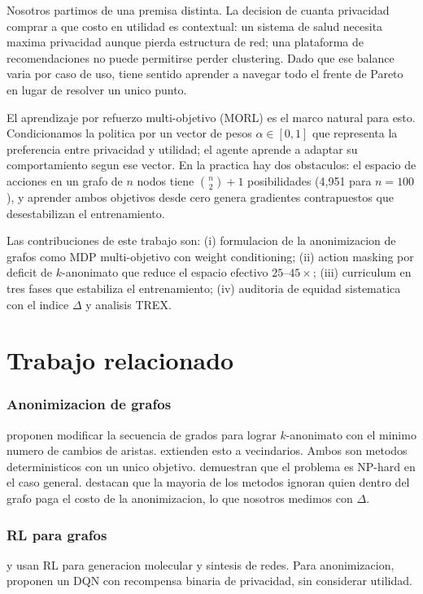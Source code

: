 \documentclass[10pt,twocolumn,letterpaper]{article}
\newcommand{\Ddelta}{\Delta}
\begin{document}
Nosotros partimos de una premisa distinta. La decision de cuanta privacidad comprar a
que costo en utilidad es contextual: un sistema de salud necesita maxima privacidad
aunque pierda estructura de red; una plataforma de recomendaciones no puede permitirse
perder clustering. Dado que ese balance varia por caso de uso, tiene sentido aprender
a navegar todo el frente de Pareto en lugar de resolver un unico punto.

El aprendizaje por refuerzo multi-objetivo (MORL) es el marco natural para esto.
Condicionamos la politica por un vector de pesos $\alpha \in [0,1]$ que representa la
preferencia entre privacidad y utilidad; el agente aprende a adaptar su comportamiento
segun ese vector. En la practica hay dos obstaculos: el espacio de acciones en un
grafo de $n$ nodos tiene $\binom{n}{2}+1$ posibilidades (4{,}951 para $n=100$), y
aprender ambos objetivos desde cero genera gradientes contrapuestos que desestabilizan
el entrenamiento.

Las contribuciones de este trabajo son: (i) formulacion de la anonimizacion de grafos
como MDP multi-objetivo con weight conditioning; (ii) action masking por deficit de
$k$-anonimato que reduce el espacio efectivo $25$--$45\times$; (iii) curriculum en
tres fases que estabiliza el entrenamiento; (iv) auditoria de equidad sistematica con
el indice $\Ddelta$ y analisis TREX.

\section{Trabajo relacionado}

\subsubsection*{Anonimizacion de grafos}
\citet{liu2008towards} proponen modificar la secuencia de grados para lograr
$k$-anonimato con el minimo numero de cambios de aristas. \citet{zhou2008preserving}
extienden esto a vecindarios. Ambos son metodos deterministicos con un unico objetivo.
\citet{Chester2013} demuestran que el problema es NP-hard en el caso general.
\citet{Mauw2021} destacan que la mayoria de los metodos ignoran quien dentro del grafo
paga el costo de la anonimizacion, lo que nosotros medimos con $\Ddelta$.

\subsubsection*{RL para grafos}
\citet{you2018graph} y \citet{zhou2019optimization} usan RL para generacion molecular
y sintesis de redes. Para anonimizacion, \citet{Gao2022} proponen un DQN con
recompensa binaria de privacidad, sin considerar utilidad.
\end{document}
